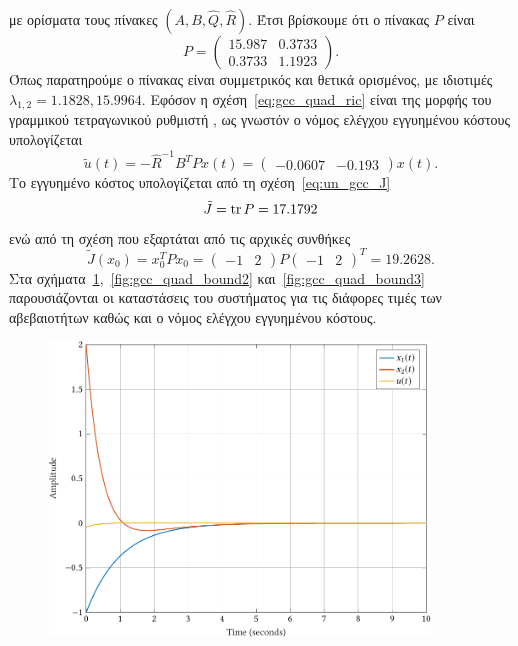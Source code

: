 με ορίσματα τους πίνακες \( (A, B, \hat{Q}, \hat{R} ) \). Έτσι βρίσκουμε ότι ο
πίνακας \( P \) είναι
\[
  P =
  \begin{pmatrix}
      15.987 & 0.3733 \\
      0.3733 & 1.1923
  \end{pmatrix}.
\]
Όπως παρατηρούμε ο πίνακας είναι συμμετρικός και θετικά ορισμένος, με ιδιοτιμές
\( \lambda_{1,2} = 1.1828, 15.9964 \). Εφόσον η σχέση~\eqref{eq:gcc_quad_ric}
είναι της μορφής του γραμμικού τετραγωνικού ρυθμιστή , ως γνωστόν ο
νόμος ελέγχου εγγυημένου κόστους υπολογίζεται
\[
    \tilde{u}(t) = - \hat{R}^{-1}B^{T}Px(t) =
    \begin{pmatrix}
        -0.0607 & -0.193
    \end{pmatrix}x(t).
\]
Το εγγυημένο κόστος υπολογίζεται από τη σχέση~\eqref{eq:un_gcc_J}
\[
   \tilde{J} = \operatorname{tr}{P} = 17.1792
\]
ενώ από τη σχέση που εξαρτάται από τις αρχικές συνθήκες
\[
    \tilde{J}(x_0) = x_0^{T}Px_0 =
    \begin{pmatrix}
        -1 & 2
    \end{pmatrix}P
    \begin{pmatrix}
        -1 & 2
    \end{pmatrix}^T = 19.2628.
\]
Στα σχήματα~\ref{fig:gcc_quad_bound1},~\ref{fig:gcc_quad_bound2}
και~\ref{fig:gcc_quad_bound3} παρουσιάζονται οι καταστάσεις του συστήματος για
τις διάφορες τιμές των αβεβαιοτήτων καθώς και ο νόμος ελέγχου εγγυημένου
κόστους.
\begin{figure}[h]
    \centering
    \includegraphics[width=0.9\textwidth]{figures/gcc_quad_bound1.pdf}
    \label{fig:gcc_quad_bound1}
\end{figure}
